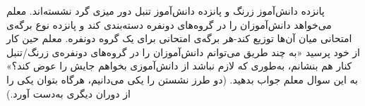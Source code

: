     \p 
پانزده دانش‌آموز زرنگ و پانزده دانش‌آموز تنبل دور میزی گرد نشسته‌اند. معلم می‌خواهد دانش‌آموزان را در گروه‌های دونفره دسته‌بندی کند و پانزده نوع برگه‌ی امتحانی میان آن‌ها توزیع کند-هر برگه‌ی امتحانی برای یک گروه دونفره. معلم حین کار از خود پرسید «به چند طریق می‌توانم دانش‌آموزان را در گروه‌های دونفره‌ی زرنگ/تنبل کنار هم بنشانم، به‌طوری که لازم نباشد از دانش‌آموزی بخواهم جایش را عوض کند؟» به این سوال معلم جواب بدهید. (دو طرز نشستن را یکی می‌دانیم، هرگاه بتوان یکی را از دوران دیگری به‌دست آورد.)